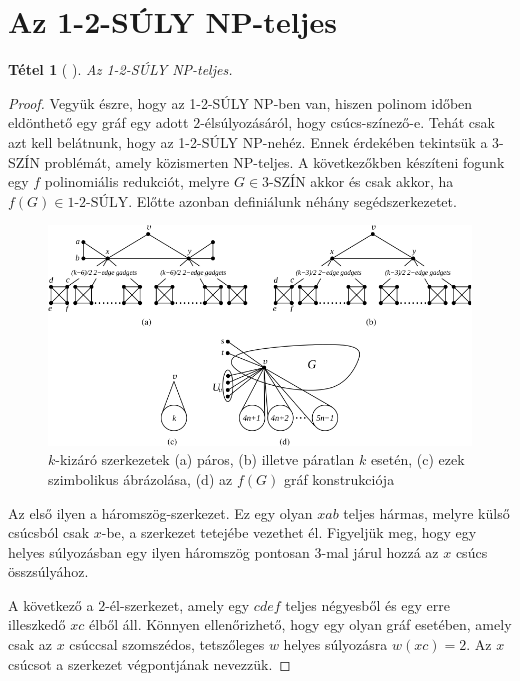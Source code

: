\documentclass[12pt, a4paper]{report}
\newtheorem{tét}{Tétel}[section]
\theoremstyle{remark}
\theoremstyle{definition}
\begin{document}
\section{Az 1-2-SÚLY NP-teljes}
\begin{tét}[\citeauthor{Dudek2011} \cite{Dudek2011}]
Az 1-2-SÚLY NP-teljes.
\end{tét}

\begin{proof}
Vegyük észre, hogy az 1-2-SÚLY NP-ben van, hiszen polinom időben eldönthető egy gráf egy adott $2$-élsúlyozásáról, hogy csúcs-színező-e. Tehát csak azt kell belátnunk, hogy az 1-2-SÚLY NP-nehéz. Ennek érdekében tekintsük a 3-SZÍN problémát, amely közismerten NP-teljes. A következőkben készíteni fogunk egy $f$ polinomiális redukciót, melyre $G \in \textrm{3-SZÍN}$ akkor és csak akkor, ha $f(G) \in \textrm{1-2-SÚLY}$. Előtte azonban definiálunk néhány segédszerkezetet.
 
\begin{figure}[!h]
\centering
\includegraphics[width=\linewidth]{./images/gadgets12}
\caption{$k$-kizáró szerkezetek (a) páros, (b) illetve páratlan $k$ esetén, (c) ezek szimbolikus ábrázolása, (d) az $f(G)$ gráf konstrukciója}
\label{fig:gadgets12}
\end{figure}

Az első ilyen a háromszög-szerkezet. Ez egy olyan $xab$ teljes hármas, melyre külső csúcsból csak $x$-be, a szerkezet tetejébe vezethet él. Figyeljük meg, hogy egy helyes súlyozásban egy ilyen háromszög pontosan $3$-mal járul hozzá az $x$ csúcs összsúlyához. 

A következő a $2$-él-szerkezet, amely egy $cdef$ teljes négyesből és egy erre illeszkedő $xc$ élből áll. Könnyen ellenőrizhető, hogy egy olyan gráf esetében, amely csak az $x$ csúccsal szomszédos, tetszőleges $w$ helyes súlyozásra $w(xc) = 2$. Az $x$ csúcsot a szerkezet végpontjának nevezzük.


\end{proof}
\end{document}
